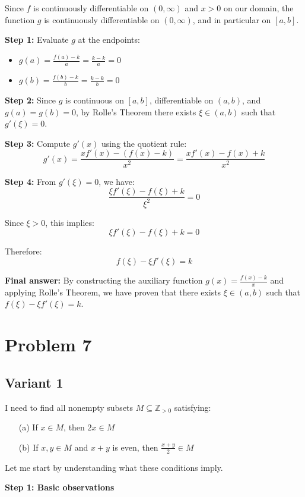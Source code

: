 \documentclass[12pt,a4paper]{article}
\theoremstyle{definition}
\begin{document}
    Since $f$ is continuously differentiable on $(0,\infty)$ and $x > 0$ on our domain, the function $g$ is continuously differentiable on $(0,\infty)$, and in particular on $[a,b]$.

    \textbf{Step 1:} Evaluate $g$ at the endpoints:
    \begin{itemize}
        \item $g(a) = \frac{f(a) - k}{a} = \frac{k - k}{a} = 0$
        \item $g(b) = \frac{f(b) - k}{b} = \frac{k - k}{b} = 0$
    \end{itemize}

    \textbf{Step 2:} Since $g$ is continuous on $[a,b]$, differentiable on $(a,b)$, and $g(a) = g(b) = 0$, by Rolle's Theorem there exists $\xi \in (a,b)$ such that $g'(\xi) = 0$.

    \textbf{Step 3:} Compute $g'(x)$ using the quotient rule:
    $$g'(x) = \frac{xf'(x) - (f(x) - k)}{x^2} = \frac{xf'(x) - f(x) + k}{x^2}$$

    \textbf{Step 4:} From $g'(\xi) = 0$, we have:
    $$\frac{\xi f'(\xi) - f(\xi) + k}{\xi^2} = 0$$

    Since $\xi > 0$, this implies:
    $$\xi f'(\xi) - f(\xi) + k = 0$$

    Therefore:
    $$f(\xi) - \xi f'(\xi) = k$$

    \textbf{Final answer:} By constructing the auxiliary function $g(x) = \frac{f(x) - k}{x}$ and applying Rolle's Theorem, we have proven that there exists $\xi \in (a,b)$ such that $f(\xi) - \xi f'(\xi) = k$.


\section{Problem 7}
\subsection{Variant 1}
    I need to find all nonempty subsets $M \subseteq \mathbb{Z}_{>0}$ satisfying:
    \begin{itemize}
        \item[(a)] If $x \in M$, then $2x \in M$
        \item[(b)] If $x,y \in M$ and $x + y$ is even, then $\frac{x + y}{2} \in M$
    \end{itemize}

    Let me start by understanding what these conditions imply.

    \textbf{Step 1: Basic observations}
\end{document}
